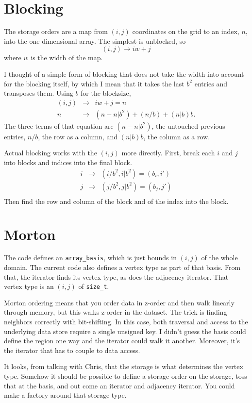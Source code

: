 \documentclass{article}
\begin{document}
\section{Blocking}
The storage orders are a map from $(i,j)$ coordinates on the grid to an index, $n$, into the one-dimensional array. The simplest is unblocked, so
\begin{equation}
  (i,j) \rightarrow iw+j
\end{equation}
where $w$ is the width of the map.

I thought of a simple form of blocking that does not take the width into
account for the blocking itself, by which I mean that it takes the last $b^2$ entries and transposes them. Using $b$ for the blocksize,
\begin{eqnarray}
  (i,j) & \rightarrow & iw+j = n\\
  n & \rightarrow & (n-n|b^2) + (n/b) + (n|b)b.
\end{eqnarray}
The three terms of that equation are $(n-n|b^2)$, the untouched previous entries, $n/b$, the row as a column, and $(n|b)b$, the column as a row.

Actual blocking works with the $(i,j)$ more directly. First, break each $i$ and $j$ into blocks and indices into the final block.
\begin{eqnarray}
  i & \rightarrow & (i/b^2, i|b^2) = (b_i, i') \\
  j & \rightarrow & (j/b^2, j|b^2) = (b_j, j') \\
\end{eqnarray}
Then find the row and column of the block and of the index into the block.


\section{Morton}
The code defines an \texttt{array\_basis}, which is just bounds in $(i,j)$ of the whole domain. The current code also defines a vertex type as part of that basis. From that, the iterator finds its vertex type, as does the adjacency iterator. That vertex type is an $(i,j)$ of \texttt{size\_t}.

Morton ordering means that you order data in z-order and then walk linearly through memory, but this walks z-order in the dataset. The trick is finding neighbors correctly with bit-shifting. In this case, both traversal and access to the underlying data store require a single unsigned key. I didn't guess the basis could define the region one way and the iterator could walk it another. Moreover, it's the iterator that has to couple to data access.

It looks, from talking with Chris, that the storage is what determines the vertex type. Somehow it should be possible to define a storage order on the storage, toss that at the basis, and out come an iterator and adjacency iterator. You could make a factory around that storage type.
\end{document}
